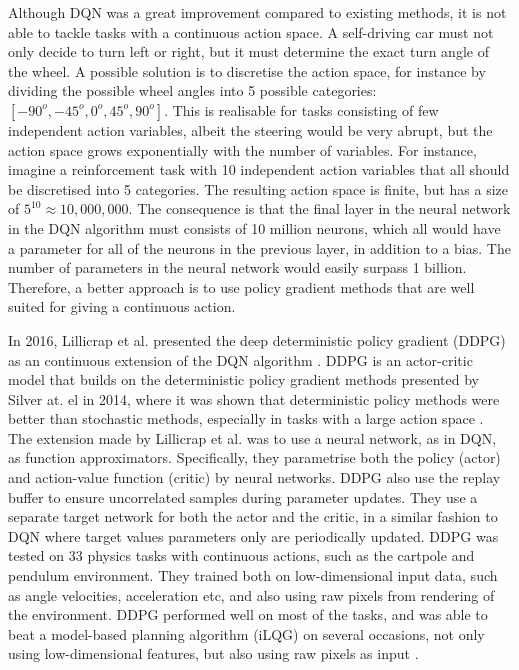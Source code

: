 \documentclass[class=book, crop=false, 11pt]{standalone}
\begin{document}
Although DQN was a great improvement compared to existing methods, it is not able to tackle tasks with a continuous action space. A self-driving car must not only decide to turn left or right, but it must determine the exact turn angle of the wheel. A possible solution is to discretise the action space, for instance by dividing the possible wheel angles into 5 possible categories: $[-90^{o},-45^{o},0^{o},45^{o},90^{o}]$. This is realisable for tasks consisting of few independent action variables, albeit the steering would be very abrupt, but the action space grows exponentially with the number of variables. For instance, imagine a reinforcement task with 10 independent action variables that all should be discretised into 5 categories. The resulting action space is finite, but has a size of $5^{10} \approx 10, 000,000$. The consequence is that the final layer in the neural network in the DQN algorithm must consists of 10 million neurons, which all would have a parameter for all of the neurons in the previous layer, in addition to a bias. The number of parameters in the neural network would easily surpass 1 billion. Therefore, a better approach is to use policy gradient methods that are well suited for giving a continuous action. 


In 2016, Lillicrap et al. presented the deep deterministic policy gradient (DDPG) as an continuous extension of the DQN algorithm  \cite{DBLP:journals/corr/LillicrapHPHETS15}. DDPG is an actor-critic model that builds on the deterministic policy gradient methods presented by Silver at. el in 2014, where it was shown that deterministic policy methods were better than stochastic methods, especially in tasks with a large action space \cite{pmlr-v32-silver14}. The extension made by Lillicrap et al. was to use a neural network, as in DQN, as function approximators. Specifically, they parametrise both the policy (actor) and action-value function (critic) by neural networks. DDPG also use the replay buffer to ensure uncorrelated samples during parameter updates. They use a separate target network for both the actor and the critic, in a similar fashion to DQN where target values parameters only are periodically updated. DDPG was tested on 33 physics tasks with continuous actions, such as the cartpole and pendulum  environment. They trained both on low-dimensional input data, such as angle velocities, acceleration etc, and also using raw pixels from rendering of the environment. DDPG performed well on most of the tasks, and was able to beat a model-based planning algorithm (iLQG) on several occasions, not only using low-dimensional features, but also using raw pixels as input \cite{DBLP:journals/corr/LillicrapHPHETS15}.
\end{document}
